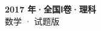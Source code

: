 \documentclass[zihao=-4, a4paper]{ctexart}
\begin{document}
\begin{center}
  {\Large\bfseries 2017 年·全国Ⅰ卷·理科}\\[4pt]
  {\large 数学 · 试题版}
\end{center}
\medskip
{}

\end{document}
